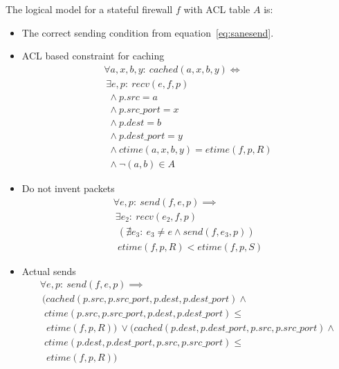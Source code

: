 The logical model for a stateful firewall $f$ with ACL table $A$ is:

\begin{itemize}
\item The correct sending condition from equation~\ref{eq:sanesend}.
\item ACL based constraint for caching
    \begin{align*}
        \forall a, x, b, y:\ cached(a, x, b, y) \iff \\
        \ \exists e, p:\ recv(e, f, p)\\
        \ \ \land p.src = a\\
        \ \ \land p.src\_port = x\\
        \ \ \land p.dest = b\\
        \ \ \land p.dest\_port = y\\
        \ \ \land ctime(a, x, b, y) = etime(f, p, R)\\
        \ \ \land \lnot \left(a, b\right) \in A
    \end{align*}
\item Do not invent packets
     \begin{align*}
         \forall e, p:\ send(f, e, p) \implies\\
         \ \exists e_2:\ recv(e_2, f, p)\\
         \ \ \left(\nexists e_3:\ e_3 \neq e \land send(f, e_3, p)\right)\\
         \ \ etime(f, p, R) < etime(f, p, S)
     \end{align*}
\item Actual sends
        \begin{align*}
            \forall e, p:\ send(f, e, p) \implies\\
            \ (cached(p.src, p.src\_port, p.dest, p.dest\_port) \land\\
             \  \     ctime(p.src, p.src\_port, p.dest, p.dest\_port) \leq\\
             \ \ \    etime(f, p, R))
             \ \lor (cached(p.dest, p.dest\_port, p.src, p.src\_port) \land\\
             \  \     ctime(p.dest, p.dest\_port, p.src, p.src\_port) \leq\\
             \ \ \    etime(f, p, R))
        \end{align*}
\end{itemize}

